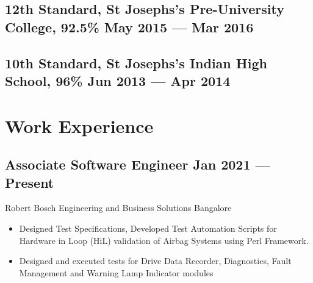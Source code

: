 \documentclass[a4,10pt]{article}
\newcommand{\subtext}[1]{
#1\par\vspace{-0.2cm}}
\newenvironment{zitemize}{
\begin{itemize}\itemsep0pt \parskip0pt \parsep1pt}
{\end{itemize}\vspace{-0.5cm}}
\begin{document}
\subsection*{12th Standard, {\normalsize \normalfont St Josephs's Pre-University College, 92.5\%} \hfill May 2015 --- Mar 2016}
\vspace{0.1cm}
\subsection*{10th Standard, {\normalsize \normalfont St Josephs's Indian High School, 96\%} \hfill Jun 2013 --- Apr 2014} 
\vspace{0.2cm}

\section{Work Experience}

        

\subsection*{Associate Software Engineer \hfill Jan 2021 --- Present} 
\subtext{Robert Bosch Engineering and Business Solutions \hfill Bangalore} 
    \begin{zitemize}
          \item Designed Test Specifications, Developed Test Automation Scripts  for Hardware in Loop (HiL) validation of Airbag Systems using Perl Framework.
          \item Designed and executed tests for Drive Data Recorder, Diagnostics, Fault Management and Warning Lamp Indicator modules
    \end{zitemize}
\end{document}
